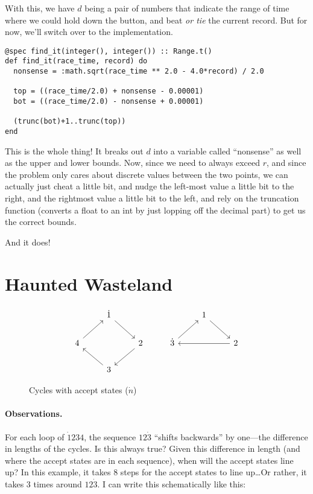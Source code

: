 \documentclass{article}
\begin{document}
With this, we have $d$ being a pair of numbers that indicate the range of time where we could hold down the button, and beat \emph{or tie} the current record. But for now, we'll switch over to the implementation.

\begin{verbatim}
@spec find_it(integer(), integer()) :: Range.t()
def find_it(race_time, record) do
  nonsense = :math.sqrt(race_time ** 2.0 - 4.0*record) / 2.0

  top = ((race_time/2.0) + nonsense - 0.00001)
  bot = ((race_time/2.0) - nonsense + 0.00001)

  (trunc(bot)+1..trunc(top))
end
\end{verbatim}

This is the whole thing! It breaks out $d$ into a variable called ``nonsense'' as well as the upper and lower bounds. Now, since we need to always exceed $r$, and since the problem only cares about discrete values between the two points, we can actually just cheat a little bit, and nudge the left-most value a little bit to the right, and the rightmost value a little bit to the left, and rely on the truncation function (converts a float to an int by just lopping off the decimal part) to get us the correct bounds.

And it does!


\setcounter{section}{7}
\section{Haunted Wasteland}
\begin{figure*}[h]
  \centering
\[\begin{tikzcd}
	& {\dot{1}} &&& 1 \\
	4 && 2 & {\dot{3}} && 2 \\
	& 3
	\arrow[from=1-2, to=2-3]
	\arrow[from=2-3, to=3-2]
	\arrow[from=3-2, to=2-1]
	\arrow[from=2-1, to=1-2]
	\arrow[from=1-5, to=2-6]
	\arrow[from=2-6, to=2-4]
	\arrow[from=2-4, to=1-5]
\end{tikzcd}\]

\caption{Cycles with accept states ($\dot{n}$)}
\end{figure*}


\NewDocumentCommand{}

\paragraph{Observations.} For each loop of $\dot{1}234$, the sequence $12\dot{3}$ ``shifts backwards'' by one---the difference in lengths of the cycles. Is this always true? \bullet{} Given this difference in length (and where the accept states are in each sequence), when will the accept states line up? \bullet{} In this example, it takes 8 steps for the accept states to line up\dots Or rather, it takes 3 times around $12\dot{3}$. I can write this schematically like this:
\end{document}

